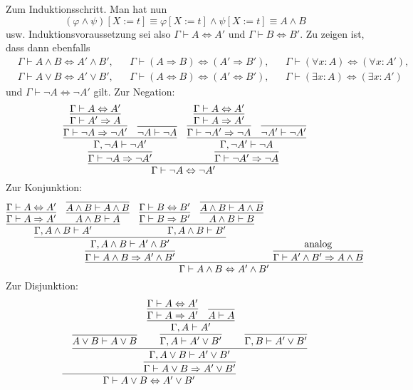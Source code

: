 \begin{Beweis}
Zum Induktionsschritt. Man hat nun
\[(\varphi\land\psi)[X{:=}t]
\equiv \varphi[X{:=}t]\land\psi[X{:=}t]\equiv A\land B\]
usw. Induktionsvoraussetzung sei also $\Gamma\vdash A\Leftrightarrow A'$
und $\Gamma\vdash B\Leftrightarrow B'$. Zu zeigen ist,
dass dann ebenfalls
\begin{align*}
& \Gamma\vdash A\land B \Leftrightarrow A'\land B',
&& \Gamma\vdash (A\Rightarrow B) \Leftrightarrow (A'\Rightarrow B'),
&& \Gamma\vdash (\forall x\colon A)\Leftrightarrow (\forall x\colon A'),\\
& \Gamma\vdash A\lor B \Leftrightarrow A'\lor B',
&& \Gamma\vdash (A\Leftrightarrow B)\Leftrightarrow (A'\Leftrightarrow B'),
&& \Gamma\vdash (\exists x\colon A)\Leftrightarrow (\exists x\colon A')
\end{align*}
und $\Gamma\vdash\neg A\Leftrightarrow\neg A'$ gilt. Zur Negation:
\[\infer{\Gamma\vdash\neg A\Leftrightarrow\neg A'}{
  \infer{\Gamma\vdash\neg A\Rightarrow\neg A'}{
    \infer{\Gamma,\neg A\vdash\neg A'}{
      \infer{\Gamma\vdash\neg A\Rightarrow\neg A'}{
        \infer{\Gamma\vdash A'\Rightarrow A}{
          \Gamma\vdash A\Leftrightarrow A'}}
    & \infer{\neg A\vdash\neg A}{}}}
& \infer{\Gamma\vdash\neg A'\Rightarrow\neg A}{
    \infer{\Gamma,\neg A'\vdash\neg A}{
      \infer{\Gamma\vdash\neg A'\Rightarrow\neg A}{
        \infer{\Gamma\vdash A\Rightarrow A'}{
          \Gamma\vdash A\Leftrightarrow A'}}
    & \infer{\neg A'\vdash\neg A'}{}}}}
\]
Zur Konjunktion:
\[
\infer{\Gamma\vdash A\land B\Leftrightarrow A'\land B'}{
  \infer{\Gamma\vdash A\land B\Rightarrow A'\land B'}{
    \infer{\Gamma,A\land B\vdash A'\land B'}{
      \infer{\Gamma,A\land B\vdash A'}{
        \infer{\Gamma\vdash A\Rightarrow A'}{
          \Gamma\vdash A\Leftrightarrow A'}
      & \infer{A\land B\vdash A}{
          \infer{A\land B\vdash A\land B}{}}}
    & \infer{\Gamma,A\land B\vdash B'}{
        \infer{\Gamma\vdash B\Rightarrow B'}{
          \Gamma\vdash B\Leftrightarrow B'}
      & \infer{A\land B\vdash B}{
          \infer{A\land B\vdash A\land B}{}}}}}
& \infer{\Gamma\vdash A'\land B'\Rightarrow A\land B}{\text{analog}}}
\]
Zur Disjunktion:
\[
\infer{\Gamma\vdash A\lor B\Leftrightarrow A'\lor B'}{
& \infer{\Gamma\vdash A\lor B\Rightarrow A'\lor B'}{
    \infer{\Gamma, A\lor B\vdash A'\lor B'}{
      \infer{A\lor B\vdash A\lor B}{}
    & \infer{\Gamma, A\vdash A'\lor B'}{
        \infer{\Gamma, A\vdash A'}{
          \infer{\Gamma\vdash A\Rightarrow A'}{
            \Gamma\vdash A\Leftrightarrow A'}
        & \infer{A\vdash A}{}}}
    & \infer{\Gamma, B\vdash A'\lor B'}{
}}}}\]
\end{Beweis}
